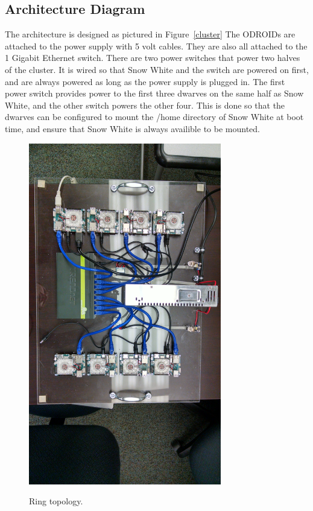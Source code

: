 \subsection{Architecture  Diagram}

The architecture is designed as pictured in Figure~\ref{cluster} The ODROIDs are attached to the power supply with 5 volt cables. They are also all attached to the 1 Gigabit Ethernet switch. There are two power switches that power two halves of the cluster. It is wired so that Snow White and the switch are powered on first, and are always powered as long as the power supply is plugged in. The first power switch provides power to the first three dwarves on the same half as Snow White, and the other switch powers the other four. This is done so that the dwarves can be configured to mount the /home directory of Snow White at boot time, and ensure that Snow White is always availible to be mounted.

 \begin{figure}[tbh]
	\caption{Ring topology.}
	\centering
		\includegraphics[width=0.75\textwidth]{IMG_20151201_104751350_HDR.jpg}
	\label{fig:ring}
\end{figure}

